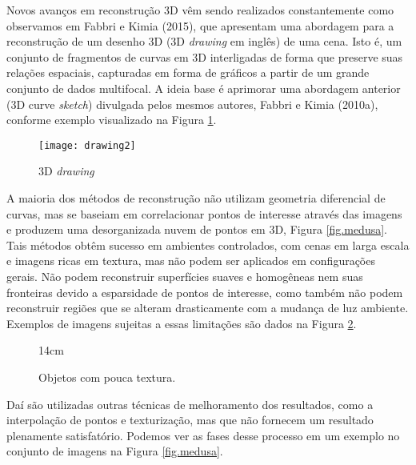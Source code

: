 Novos avanços em reconstrução 3D vêm sendo realizados constantemente como observamos em Fabbri e Kimia (2015), que apresentam uma abordagem para a reconstrução de um desenho 3D (3D \emph{drawing} em inglês) de uma cena. Isto é, um conjunto de fragmentos de curvas em 3D interligadas de forma que preserve suas relações espaciais, capturadas em forma de gráficos a partir de um grande conjunto de dados multifocal. A ideia base é aprimorar uma abordagem anterior (3D curve \emph{sketch}) divulgada pelos mesmos autores, Fabbri e Kimia (2010a), conforme exemplo visualizado na Figura \ref{fig.drawing2}.
\begin{figure}[!htb]{\textwidth}
\caption{3D \emph{drawing}}
\texttt{[image: drawing2]}
\label{fig.drawing2}
\end{figure}
A maioria dos métodos de reconstrução não utilizam geometria diferencial de curvas, mas se baseiam em correlacionar pontos de interesse através das imagens e produzem uma desorganizada nuvem de pontos em 3D, Figura \ref{fig.medusa}. Tais métodos obtêm sucesso em ambientes controlados, com cenas em larga escala e imagens ricas em textura, mas não podem ser aplicados em configurações gerais. Não podem reconstruir superfícies suaves e homogêneas nem suas fronteiras devido a esparsidade de pontos de interesse, como também não podem reconstruir regiões que se alteram drasticamente com a mudança de luz ambiente. Exemplos de imagens sujeitas a essas limitações são dados na Figura \ref{fig.carro-objeto-curvo}.
\begin{figure}[!htb]{14cm}
\caption{Objetos com pouca textura.}
\hfill
{}\hfill
{}
\label{fig.carro-objeto-curvo}
\end{figure}
Daí são utilizadas outras técnicas de melhoramento dos resultados, como a interpolação de pontos e texturização, mas que não fornecem um resultado plenamente satisfatório. Podemos ver as fases desse processo em um exemplo no conjunto de imagens na Figura \ref{fig.medusa}.

